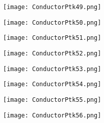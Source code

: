 \documentclass[pdf]{beamer}
\begin{document}
\begin{frame}
\begin{figure}[!h]
\centering
\texttt{[image: ConductorPtk49.png]}
\end{figure}
\end{frame}

\begin{frame}
\begin{figure}[!h]
\centering
\texttt{[image: ConductorPtk50.png]}
\end{figure}
\end{frame}

\begin{frame}
\begin{figure}[!h]
\centering
\texttt{[image: ConductorPtk51.png]}
\end{figure}
\end{frame}

\begin{frame}
\begin{figure}[!h]
\centering
\texttt{[image: ConductorPtk52.png]}
\end{figure}
\end{frame}

\begin{frame}
\begin{figure}[!h]
\centering
\texttt{[image: ConductorPtk53.png]}
\end{figure}
\end{frame}

\begin{frame}
\begin{figure}[!h]
\centering
\texttt{[image: ConductorPtk54.png]}
\end{figure}
\end{frame}

\begin{frame}
\begin{figure}[!h]
\centering
\texttt{[image: ConductorPtk55.png]}
\end{figure}
\end{frame}

\begin{frame}
\begin{figure}[!h]
\centering
\texttt{[image: ConductorPtk56.png]}
\end{figure}
\end{frame}
\end{document}

